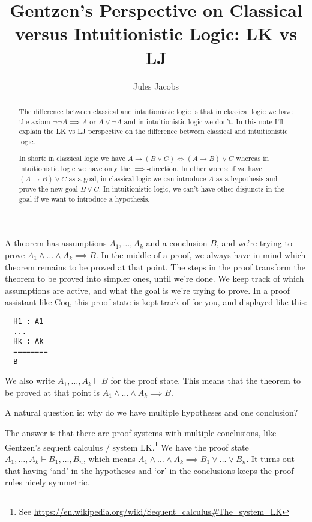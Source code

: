 \documentclass[a4paper, 11pt]{article}
\title{Gentzen's Perspective on Classical versus Intuitionistic Logic: LK vs LJ}
\author{Jules Jacobs}
\theoremstyle{definition}
\begin{document}
\maketitle

\begin{abstract}
  The difference between classical and intuitionistic logic is that in classical logic we have the axiom $\neg \neg A \implies A$ or $A \vee \neg A$ and in intuitionistic logic we don't. In this note I'll explain the LK vs LJ perspective on the difference between classical and intuitionistic logic.

  In short: in classical logic we have $A \to (B \vee C) \iff (A \to B) \vee C$ whereas in intuitionistic logic we have only the $\implies$-direction. In other words: if we have $(A \to B) \vee C$ as a goal, in classical logic we can introduce $A$ as a hypothesis and prove the new goal $B \vee C$. In intuitionistic logic, we can't have other disjuncts in the goal if we want to introduce a hypothesis.
\end{abstract}

A theorem has assumptions $A_1, \dots, A_k$ and a conclusion $B$, and we're trying to prove $A_1 \wedge \dots \wedge A_k \implies B$. In the middle of a proof, we always have in mind which theorem remains to be proved at that point. The steps in the proof transform the theorem to be proved into simpler ones, until we're done. We keep track of which assumptions are active, and what the goal is we're trying to prove. In a proof assistant like Coq, this proof state is kept track of for you, and displayed like this:

\begin{lstlisting}
  H1 : A1
  ...
  Hk : Ak
  ========
  B
\end{lstlisting}

We also write $A_1, \dots, A_k \vdash B$ for the proof state. This means that the theorem to be proved at that point is $A_1 \wedge \dots \wedge A_k \implies B$.

A natural question is: why do we have multiple hypotheses and one conclusion?

The answer is that there are proof systems with multiple conclusions, like Gentzen's sequent calculus / system LK.\footnote{See \url{https://en.wikipedia.org/wiki/Sequent_calculus\#The_system_LK}} We have the proof state $A_1, \dots, A_k \vdash B_1, \dots, B_n$, which means $A_1 \wedge \dots \wedge A_k \implies B_1 \vee \dots \vee B_n$. It turns out that having `and' in the hypotheses and `or' in the conclusions keeps the proof rules nicely symmetric.
\end{document}
